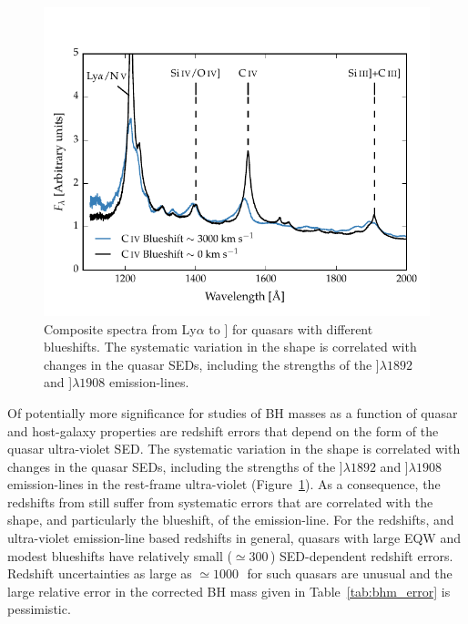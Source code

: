 \begin{figure}[h!]
\centering
  \includegraphics[width=\columnwidth]{figures/chapter03/blueshift_composite.pdf}
\caption[{Composite spectra from Ly$\alpha$ to ] for quasars with different  blueshifts.}]{Composite spectra from Ly$\alpha$ to ] for quasars with different  blueshifts. The systematic variation in the  shape is correlated with changes in the quasar SEDs, including the strengths of the ]$\lambda$$1892$ and ]$\lambda$$1908$ emission-lines.}
  \label{fig:blueshift_composite}
\end{figure}

Of potentially more significance for studies of BH masses as a function of quasar and host-galaxy properties are redshift errors that depend on the form of the quasar ultra-violet SED.
The systematic variation in the  shape is correlated with changes in the quasar SEDs, including the strengths of the ]$\lambda$$1892$ and ]$\lambda$$1908$ emission-lines in the rest-frame ultra-violet (Figure~\ref{fig:blueshift_composite}).
As a consequence, the redshifts from \citet{hewett10} still suffer from systematic errors that are correlated with the shape, and particularly the blueshift, of the  emission-line.
For the \citet{hewett10} redshifts, and ultra-violet emission-line based redshifts in general, quasars with large  EQW and modest blueshifts have relatively small ($\simeq300$\,\kms) SED-dependent redshift errors.
Redshift uncertainties as large as $\simeq1000$\,\kms\, for such quasars are unusual and the large relative error in the corrected  BH mass given in Table~\ref{tab:bhm_error} is pessimistic.

